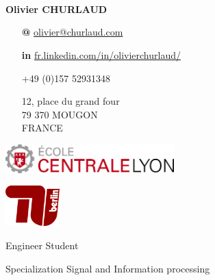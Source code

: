 \documentclass[skip,a4paper]{article}
\begin{document}
\fontsize{8.5}{9.5}
\selectfont

\begin{minipage}[c]{\linewidth}
	\begin{minipage}[c][4cm]{2.6cm}
		~\\~\\
		\vfill
		~
	\end{minipage}
	\begin{minipage}[c][4cm]{5.5cm}
		\textbf{Olivier CHURLAUD}
		
		\begin{itemize}[itemsep=0.5ex,leftmargin=3ex]
			\footnotesize
			\item[\bfseries @] \url{olivier@churlaud.com}
			\item[\bfseries \color{blue} in] {\scriptsize\url{ fr.linkedin.com/in/olivierchurlaud/}}
			\item[\Telefon] +49 (0)157 52931348
			\item[\Letter] 12, place du grand four \\
			79 370 MOUGON \\ 
			FRANCE
		\end{itemize}
	\end{minipage}
	\begin{minipage}[c][4cm]{10cm}
		\begin{minipage}[c]{7.10cm}
			\includegraphics[width=6.5cm]{img/ecl}
		\end{minipage}
		\hfill
		\begin{minipage}[c]{2.5cm}
			\includegraphics[width=2.1cm]{img/tuberlin}
		\end{minipage}
		
		\vfill
		
		\centering
		{
			\setlength{\parskip}{10pt plus 1pt minus 1pt}
			{\LARGE Engineer Student}
			
			{\Large Specialization Signal and Information processing}
		}
	\end{minipage}
\end{minipage}
\end{document}
